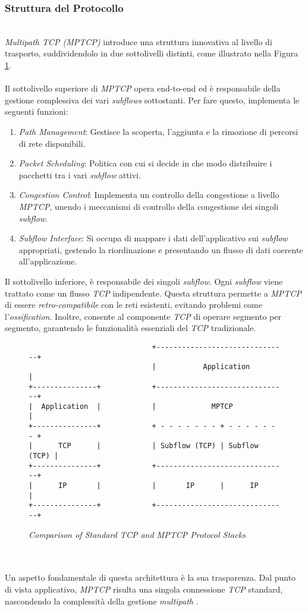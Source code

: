 \subsubsection{Struttura del Protocollo}
~\\
\indent \emph{Multipath TCP (MPTCP)} introduce una struttura innovativa al livello di trasporto, suddividendolo in due sottolivelli distinti, come illustrato nella Figura \ref{comparison}.
\\\\
Il sottolivello superiore di \emph{MPTCP} opera end-to-end ed è responsabile della gestione complessiva dei vari \emph{subflows} sottostanti. Per fare questo, implementa le seguenti funzioni:
\begin{enumerate}[label=\roman*]
    \item \emph{Path Management}: Gestisce la scoperta, l'aggiunta e la rimozione di percorsi di rete disponibili.
    \item \emph{Packet Scheduling}: Politica con cui si decide in che modo distribuire i pacchetti tra i vari \emph{subflow} attivi.
    \item \emph{Congestion Control}: Implementa un controllo della congestione a livello \emph{MPTCP}, unendo i meccanismi di controllo della congestione dei singoli \emph{subflow}. 
    \item \emph{Subflow Interface}: Si occupa di mappare i dati dell'applicativo sui \emph{subflow} appropriati, gestendo la riordinazione e presentando un flusso di dati coerente all'applicazione.
\end{enumerate}
\noindent Il sottolivello inferiore, è responsabile dei singoli \emph{subflow}. Ogni \emph{subflow} viene trattato come un flusso \emph{TCP} indipendente. Questa struttura permette a \emph{MPTCP} di essere \emph{retro-compatibile} con le reti esistenti, evitando problemi come l'\emph{ossification}. Inoltre, consente al componente \emph{TCP} di operare segmento per segmento, garantendo le funzionalità essenziali del \emph{TCP} tradizionale.
\begin{figure}[!h]
  \centering
    \begin{BVerbatim}
                             +-------------------------------+
                             |           Application         |
+---------------+            +-------------------------------+
|  Application  |            |             MPTCP             |
+---------------+            + - - - - - - - + - - - - - - - +
|      TCP      |            | Subflow (TCP) | Subflow (TCP) |
+---------------+            +-------------------------------+
|      IP       |            |       IP      |      IP       |
+---------------+            +-------------------------------+
               \end{BVerbatim}
    \caption{\emph{Comparison of Standard TCP and MPTCP Protocol Stacks}}
    \label{comparison}
    \end{figure}
\\\\
\noindent Un aspetto fondamentale di questa architettura è la sua trasparenza. Dal punto di vista applicativo, \emph{MPTCP} risulta una singola connessione \emph{TCP} standard, nascondendo la complessità della gestione \emph{multipath} \cite{site:mptcp-design}.
